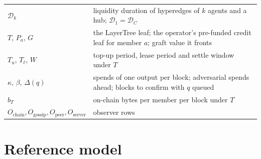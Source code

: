 \documentclass[11pt]{article}
\theoremstyle{plain}
\theoremstyle{definition}
\theoremstyle{remark}
\newcommand{\Dur}{\mathcal{D}}
\begin{document}
\begin{center}
\begin{tabular}{@{}>{\raggedright\arraybackslash}p{4.6cm}>{\raggedright\arraybackslash}p{9.6cm}@{}}
$\Dur_k$ & liquidity duration of hyperedges of $k$ agents and a hub; $\Dur_1=\Dur_C$ \\
$T$, $P_a$, $G$ & the LayerTree leaf; the operator's pre-funded credit leaf for member $a$; graft value it fronts \\
$T_u$, $T_\ell$, $W$ & top-up period, lease period and settle window under $T$ \\
$\kappa$, $\beta$, $\Delta(q)$ & spends of one output per block; adversarial spends ahead; blocks to confirm with $q$ queued \\
$b_T$ & on-chain bytes per member per block under $T$ \\
$O_{\mathrm{chain}},O_{\mathrm{gossip}},O_{\mathrm{peer}},O_{\mathrm{server}}$ & observer rows \\
\bottomrule
\end{tabular}
\end{center}

\section{Reference model}
\label{app:model}
\end{document}
